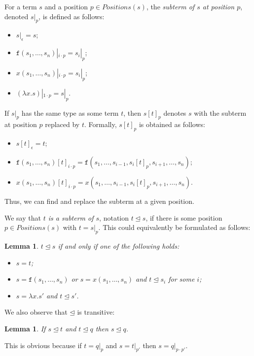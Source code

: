 \documentclass{lmcs}
\theoremstyle{theorem}\newtheorem{theorem}[dummy]{Theorem}
\theoremstyle{theorem}\newtheorem{lemma}[dummy]{Lemma}
\theoremstyle{theorem}\newtheorem{corollary}[dummy]{Corollary}
\theoremstyle{definition}\newtheorem{definition}[dummy]{Definition}
\theoremstyle{definition}\newtheorem{example}[dummy]{Example}
\newcommand{\Positions}{\mathit{Positions}}
\newcommand{\identifier}[1]{\mathtt{#1}}
\newcommand{\afun}{\identifier{f}}
\newcommand{\avar}{x}
\newcommand{\abs}[2]{\lambda #1.#2}
\newcommand{\subtermeq}{\unlhd}
\begin{document}
For a term $s$ and a position $p \in \Positions(s)$, the \emph{subterm of $s$ at position $p$},
denoted $s|_p$, is defined as follows:
\begin{itemize}
\item $s|_\epsilon = s$;
\item $\afun(s_1,\dots,s_n)|_{i \cdot p} = s_i|_p$;
\item $\avar(s_1,\dots,s_n)|_{i \cdot p} = s_i|_p$;
\item $(\abs{\avar}{s})|_{1 \cdot p} = s|_p$.
\end{itemize}

If $s|_p$ has the same type as some term $t$, then $s[t]_p$ denotes $s$ with the subterm at position
$p$ replaced by $t$.  Formally, $s[t]_p$ is obtained as follows:
\begin{itemize}
\item $s[t]_\epsilon = t$;
\item $\afun(s_1,\dots,s_n)[t]_{i \cdot p} = \afun(s_1,\dots,s_{i-1},s_i[t]_p,s_{i+1},\dots,s_n)$;
\item $\avar(s_1,\dots,s_n)[t]_{i \cdot p} = \avar(s_1,\dots,s_{i-1},s_i[t]_p,s_{i+1},\dots,s_n)$.
\end{itemize}
Thus, we can find and replace the subterm at a given position.

We say that \emph{$t$ is a subterm of $s$}, notation $t \subtermeq s$, if there is some position
$p \in \Positions(s)$ with $t = s|_p$.  This could equivalently be formulated as follows:

\begin{lemma}
$t \subtermeq s$ if and only if one of the following holds:
\begin{itemize}
\item $s = t$;
\item $s = \afun(s_1,\dots,s_n)$ or $s = \avar(s_1,\dots,s_n)$ and $t \subtermeq s_i$ for some $i$;
\item $s = \abs{x}{s'}$ and $t \subtermeq s'$.
\end{itemize}
\end{lemma}

We also observe that $\subtermeq$ is transitive:

\begin{lemma}
If $s \subtermeq t$ and $t \subtermeq q$ then $s \subtermeq q$.
\end{lemma}

This is obvious because if $t = q|_p$ and $s = t|_{p'}$ then $s = q|_{p \cdot p'}$.
\end{document}
